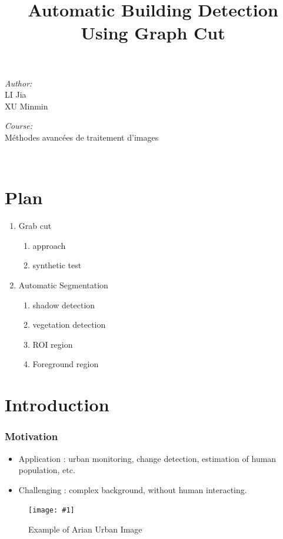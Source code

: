 \documentclass[compress]{beamer} %
\newcommand{\insertF}[3]{
  \begin{figure}[h!]
    \centering
    \begin{minipage}{#3\linewidth}
    \texttt{[image: \#1]}
    \end{minipage}  
      \caption{#2}
  \end{figure}  
}
\begin{document}
 \title{Automatic Building Detection Using Graph Cut}  

 \begin{frame}
\titlepage
    \centering
    \begin{minipage}{0.4\textwidth}
    \begin{flushleft} \large
    \emph{Author:}\\
    LI Jia\\
    XU Minmin\\
    
    \end{flushleft}
    \end{minipage}
    \begin{minipage}{0.4\textwidth}
    \begin{flushright} \large
    \emph{Course:}\\
    Méthodes avancées de traitement d'images 
    \end{flushright}
    \end{minipage}\\[3cm]
 \end{frame}

 \section{Plan}
 \begin{frame}
  \scriptsize
  {
  \begin{enumerate}
  \item Grab cut 
    \begin{enumerate}
     \item approach
     \item synthetic test
    \end{enumerate}
  \item Automatic Segmentation
    \begin{enumerate}
     \item shadow detection
     \item vegetation detection
     \item ROI region
     \item Foreground region
    \end{enumerate}
  \end{enumerate}
  }
 \end{frame} 
 
 \section{Introduction}
 \begin{frame}
  \frametitle{Motivation}
  \begin{itemize}
   \item Application : urban monitoring, change detection, estimation of human population, etc.
   \item Challenging : complex background, without human interacting.
  \end{itemize}
  \insertF{vatican-city-satellite-image-ikonos-high-resolution}{Example of Arian Urban Image}{0.4}
 \end{frame}
\end{document}
